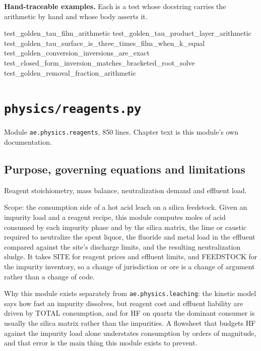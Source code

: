 \documentclass[10pt,a4paper,twoside]{report}
\begin{document}
\textbf{Hand-traceable examples.} Each is a test whose docstring carries the arithmetic by hand and whose body asserts it.

\begin{verbatimsmall}
test_golden_tau_film_arithmetic
test_golden_tau_product_layer_arithmetic
test_golden_tau_surface_is_three_times_film_when_k_equal
test_golden_conversion_inversions_are_exact
test_closed_form_inversion_matches_bracketed_root_solve
test_golden_removal_fraction_arithmetic
\end{verbatimsmall}

\clearpage

\chapter{\texttt{physics/reagents.py}}\label{ch:reagents}


{\footnotesize\color{slate}Module \texttt{ae.physics.reagents}, 850 lines. Chapter text is this module's own documentation.\par}

\section{Purpose, governing equations and limitations}

Reagent stoichiometry, mass balance, neutralization demand and effluent load.

Scope: the consumption side of a hot acid leach on a silica feedstock. Given an impurity load and a reagent recipe, this module computes moles of acid consumed by each impurity phase and by the silica matrix, the lime or caustic required to neutralize the spent liquor, the fluoride and metal load in the effluent compared against the site's discharge limits, and the resulting neutralization sludge. It takes SITE for reagent prices and effluent limits, and FEEDSTOCK for the impurity inventory, so a change of jurisdiction or ore is a change of argument rather than a change of code.

Why this module exists separately from \texttt{ae.physics.leaching}: the kinetic model says how fast an impurity dissolves, but reagent cost and effluent liability are driven by TOTAL consumption, and for HF on quartz the dominant consumer is usually the silica matrix rather than the impurities. A flowsheet that budgets HF against the impurity load alone understates consumption by orders of magnitude, and that error is the main thing this module exists to prevent.
\end{document}
